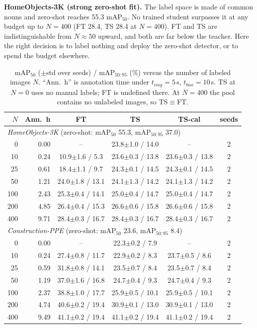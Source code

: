 \documentclass[conference]{IEEEtran}
\begin{document}
\textbf{HomeObjects-3K (strong zero-shot fit).} The label space is made of common nouns and zero-shot reaches 55.3 mAP$_{50}$. No trained student surpasses it at any budget up to $N{=}400$ (FT 28.4, TS 28.4 at $N{=}400$). FT and TS are indistinguishable from $N{\approx}50$ upward, and both are far below the teacher. Here the right decision is to label nothing and deploy the zero-shot detector, or to spend the budget elsewhere.

\begin{table}[t]
\caption{mAP$_{50}$ ($\pm$std over seeds) / mAP$_{50:95}$ (\%) versus the number of labeled images $N$. ``Ann.\ h'' is annotation time under $t_{img}{=}5$\,s, $t_{box}{=}10$\,s. TS at $N{=}0$ uses no manual labels; FT is undefined there. At $N{=}400$ the pool contains no unlabeled images, so TS$\equiv$FT.}
\label{tab:main}
\centering\scriptsize
\setlength{\tabcolsep}{2.5pt}
\begin{tabular}{rrcccc}
\toprule
$N$ & Ann.\ h & FT & TS & TS-cal & seeds\\
\midrule
\multicolumn{6}{l}{\textit{HomeObjects-3K} (zero-shot: mAP$_{50}$ 55.3, mAP$_{50:95}$ 37.0)} \\
0 & 0.00 & -- & 23.8$\pm$1.0 / 14.0 & -- & 2 \\
10 & 0.24 & 10.9$\pm$1.6 / 5.3 & 23.6$\pm$0.3 / 13.8 & 23.6$\pm$0.3 / 13.8 & 2 \\
25 & 0.61 & 18.4$\pm$1.1 / 9.7 & 24.3$\pm$0.1 / 14.5 & 24.3$\pm$0.1 / 14.5 & 2 \\
50 & 1.21 & 24.0$\pm$1.8 / 13.1 & 24.1$\pm$1.3 / 14.2 & 24.1$\pm$1.3 / 14.2 & 2 \\
100 & 2.43 & 25.3$\pm$0.4 / 14.1 & 25.0$\pm$0.4 / 14.7 & 25.0$\pm$0.4 / 14.7 & 2 \\
200 & 4.85 & 26.4$\pm$0.4 / 15.3 & 26.6$\pm$0.6 / 15.8 & 26.6$\pm$0.6 / 15.8 & 2 \\
400 & 9.71 & 28.4$\pm$0.3 / 16.7 & 28.4$\pm$0.3 / 16.7 & 28.4$\pm$0.3 / 16.7 & 2 \\
\midrule
\multicolumn{6}{l}{\textit{Construction-PPE} (zero-shot: mAP$_{50}$ 23.6, mAP$_{50:95}$ 8.4)} \\
0 & 0.00 & -- & 22.3$\pm$0.2 / 7.9 & -- & 2 \\
10 & 0.24 & 27.4$\pm$0.8 / 11.7 & 22.9$\pm$0.2 / 8.3 & 23.7$\pm$0.5 / 8.6 & 2 \\
25 & 0.59 & 31.8$\pm$0.8 / 14.1 & 23.5$\pm$0.7 / 8.4 & 23.5$\pm$0.7 / 8.4 & 2 \\
50 & 1.19 & 37.0$\pm$1.6 / 16.8 & 24.7$\pm$0.4 / 9.3 & 24.7$\pm$0.4 / 9.3 & 2 \\
100 & 2.37 & 38.8$\pm$1.0 / 17.7 & 25.9$\pm$0.5 / 10.1 & 25.9$\pm$0.5 / 10.1 & 2 \\
200 & 4.74 & 40.6$\pm$0.2 / 19.4 & 30.9$\pm$0.1 / 13.0 & 30.9$\pm$0.1 / 13.0 & 2 \\
400 & 9.49 & 41.1$\pm$0.2 / 19.4 & 41.1$\pm$0.2 / 19.4 & 41.1$\pm$0.2 / 19.4 & 2 \\
\midrule
\bottomrule
\end{tabular}
\end{table}
\end{document}

